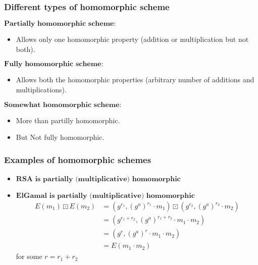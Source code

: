 \documentclass{beamer}
\begin{document}

\begin{frame}[t]
\frametitle{Different types of homomorphic scheme}
$\textbf{Partially homomorphic scheme:}$ 
\begin{itemize}
\item  Allows only one homomorphic property (addition or multiplication but not both). 
\end{itemize}
\vspace*{3mm}
$\textbf{Fully homomorphic scheme:}$ 
\begin{itemize}
\item  Allows both the homomorphic properties (arbitrary number of additions and multiplications). 
\end{itemize}
\vspace*{3mm}
$\textbf{Somewhat homomorphic scheme:}$ 
\begin{itemize}
\item  More than partilly homomorphic. 
\item   But Not fully homomorphic. 
\end{itemize}
\end{frame}


\begin{frame}[t]
\frametitle{Examples of homomorphic schemes}

\begin{itemize}
\item  $\textbf{RSA is partially (multiplicative) homomorphic}$ 
\vspace*{3mm}
\item $\textbf{ElGamal is partially (multiplicative) homomorphic}$ 
\begin{align*}
E(m_1)\boxdot E(m_2) &=(g^{r_1},(g^a)^{r_1} \cdot {m_1})\boxdot (g^{r_2},(g^a)^{r_2} \cdot {m_2})\\ &=(g^{r_1+r_2},(g^a)^{r_1+r_2} \cdot {m_1\cdot m_2})\\ &=(g^{r},(g^a)^{r} \cdot {m_1\cdot m_2})\\ &=E(m_1\cdot m_2)
\end{align*}
 for some $r=r_1+r_2$
\end{itemize}
\end{frame}


\end{document}

